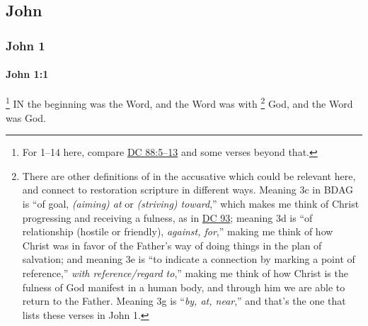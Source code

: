 \subsection{John}
	\label{JOHN}
	
	\subsubsection{John 1} %
		\label{JOHN-1}
		
		\paragraph{John 1:1} %
			\label{JOHN-1-1}

				\footnote{%
					For 1--14 here, compare \hyperref[DC88-5]{DC 88:5--13} and some verses beyond that.
					}%
			IN the beginning was the Word, and the Word was with%
				\footnote{%
					There are other definitions of  in the accusative which could be relevant here, and connect to restoration scripture in different ways. Meaning 3c in BDAG is ``of goal, \textit{(aiming) at} or \textit{(striving) toward},'' which makes me think of Christ progressing and receiving a fulness, as in \hyperref[DC93]{DC 93}; meaning 3d is ``of relationship (hostile or friendly), \textit{against, for},'' making me think of how Christ was in favor of the Father's way of doing things in the plan of salvation; and meaning 3e is ``to indicate a connection by marking a point of reference,'' \textit{with reference/regard to},'' making me think of how Christ is the fulness of God manifest in a human body, and through him we are able to return to the Father. Meaning 3g is ``\textit{by, at, near},'' and that's the one that lists these verses in John 1.
					}
			God, and the Word was God.

			\begin{framed}
			\scriptsize
				\begin{compactdesc}
					\item[SBLG]  \hyperref[LOGOS]{} \hyperref[LOGOS]{}  \hyperref[LOGOS]{}
				\end{compactdesc}
			\end{framed}

